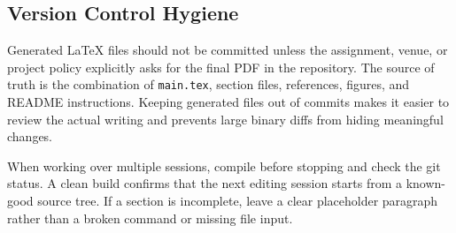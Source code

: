 \subsection{Version Control Hygiene}

Generated LaTeX files should not be committed unless the assignment, venue, or project policy explicitly asks for the final PDF in the repository. The source of truth is the combination of \texttt{main.tex}, section files, references, figures, and README instructions. Keeping generated files out of commits makes it easier to review the actual writing and prevents large binary diffs from hiding meaningful changes.

When working over multiple sessions, compile before stopping and check the git status. A clean build confirms that the next editing session starts from a known-good source tree. If a section is incomplete, leave a clear placeholder paragraph rather than a broken command or missing file input.
